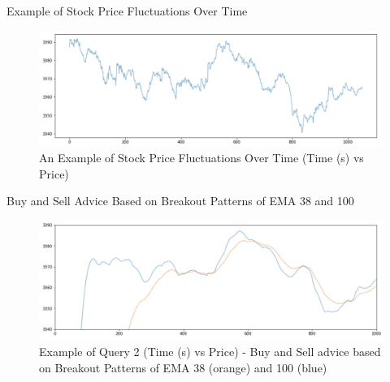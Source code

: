 \documentclass[9pt]{beamer}
\begin{document}


\begin{frame}[fragile]{Example of Stock Price Fluctuations Over Time }



    \begin{figure}
        \begin{center}
            \includegraphics[width=1\textwidth]{../paper/images/stock_example.png}
            \caption{An Example of Stock Price Fluctuations Over Time (Time (s) vs Price)}
            \label{fig:stock}
        \end{center}
    \end{figure}
    
    
    
\end{frame}




\begin{frame}[fragile]{Buy and Sell Advice Based on Breakout Patterns of EMA 38 and 100  }


    \begin{figure}
        \begin{center}
            \includegraphics[width=1\textwidth]{../paper/images/query2_example.png}
            \caption{Example of Query 2 (Time (s) vs Price) - Buy and Sell advice based on Breakout Patterns of EMA 38 (orange) and 100 (blue)}
            \label{fig:EMAs}
         \end{center}
    \end{figure}
    
\end{frame}
\end{document}
